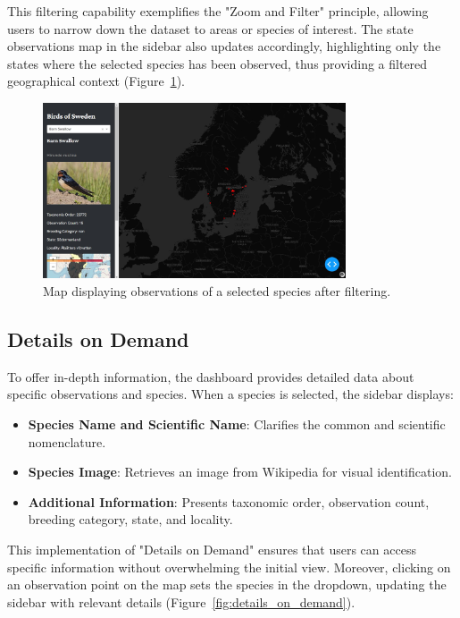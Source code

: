 This filtering capability exemplifies the "Zoom and Filter" principle, allowing users to narrow down the dataset to areas or species of interest. The state observations map in the sidebar also updates accordingly, highlighting only the states where the selected species has been observed, thus providing a filtered geographical context (Figure~\ref{fig:filtered_map}).

\begin{figure}[h] 
    \centering 
    \includegraphics[width=0.8\textwidth]{figures/species_details.jpg} 
    \caption{Map displaying observations of a selected species after filtering.} 
    \label{fig:filtered_map} 
\end{figure}

\subsection{Details on Demand}

To offer in-depth information, the dashboard provides detailed data about specific observations and species. When a species is selected, the sidebar displays:

\begin{itemize} 
    \item \textbf{Species Name and Scientific Name}: Clarifies the common and scientific nomenclature. 
    \item \textbf{Species Image}: Retrieves an image from Wikipedia for visual identification. 
    \item \textbf{Additional Information}: Presents taxonomic order, observation count, breeding category, state, and locality. 
\end{itemize}

This implementation of "Details on Demand" ensures that users can access specific information without overwhelming the initial view. Moreover, clicking on an observation point on the map sets the species in the dropdown, updating the sidebar with relevant details (Figure~\ref{fig:details_on_demand}).

